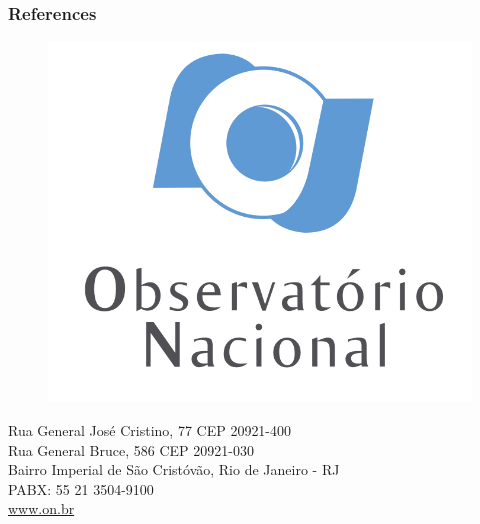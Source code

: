 \documentclass[aspectratio=10]{beamer} %
\begin{document}

\begin{frame}[allowframebreaks]
\frametitle{References}
\tiny


\end{frame}

\makeatother
{
\begin{frame}
	\begin{figure}
		\includegraphics[scale=0.25]{Imagens/logonvertical.jpg}
	\end{figure}
	\begin{center}
		\begin{minipage}{0.77\textwidth}
			\small
			\begin{center}
				Rua General José Cristino, 77 CEP 20921-400\\
				Rua General Bruce, 586 CEP 20921-030\\
				Bairro Imperial de São Cristóvão, Rio de Janeiro - RJ\\
				PABX: 55 21 3504-9100\\
				\url{www.on.br}
			\end{center}
		\end{minipage}
	\end{center}
\end{frame}
}
\end{document}
